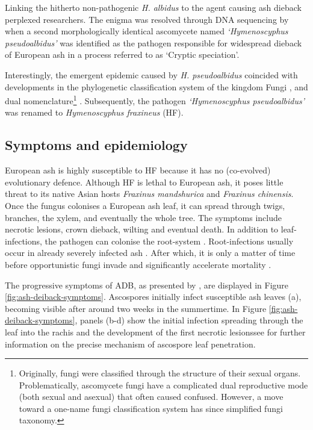 Linking the hitherto non-pathogenic \textit{H. albidus} to the agent causing ash dieback perplexed researchers. 
The enigma was resolved through DNA sequencing by \cite{queloz2011cryptic} when a second morphologically identical
ascomycete named \textit{`Hymenoscyphus pseudoalbidus'} was identified as the pathogen responsible for widespread dieback
of European ash in a process referred to as `Cryptic speciation'.

Interestingly, the emergent epidemic caused by \textit{H. pseudoalbidus} coincided with developments 
in the phylogenetic classification system of the kingdom Fungi \cite{hibbett2007higher}, 
and dual nomenclature\footnote{Originally, fungi were classified through the structure of their sexual organs.
Problematically, ascomycete fungi have a complicated dual reproductive mode (both sexual and asexual) that often caused confused. 
However, a move toward a one-name fungi classification system has since simplified fungi taxonomy.} 
\cite{wingfield2012one}. Subsequently, the pathogen \textit{`Hymenoscyphus pseudoalbidus'} was renamed to
\textit{Hymenoscyphus fraxineus} (HF).

\subsection{Symptoms and epidemiology}

European ash is highly susceptible to HF because it has no (co-evolved) evolutionary defence.
Although HF is lethal to European ash, it poses little threat to its native Asian hosts 
\textit{Fraxinus mandshurica} and \textit{Fraxinus chinensis}. Once the fungus colonises a European ash leaf,
it can spread through twigs, branches, the xylem, and eventually the whole tree.
The symptoms include necrotic lesions, crown dieback, wilting and eventual death.
In addition to leaf-infections, the pathogen can colonise the root-system \cite{schumacher2011general}.
Root-infections usually occur in already severely infected ash \cite{https://doi.org/10.1111/mpp.12073}. 
After which, it is only a matter of time before opportunistic fungi invade and significantly accelerate mortality
\cite{enderle2013temporal}.

The progressive symptoms of ADB, as presented by \cite{gross2014h}, are displayed in Figure \ref{fig:ash-deiback-symptoms}.
Ascospores initially infect susceptible ash leaves (a), 
becoming visible after around two weeks \cite{https://doi.org/10.1111/ppa.12048} in the summertime. 
In Figure \ref{fig:ash-deiback-symptoms}, panels (b-d) show the initial infection spreading through 
the leaf into the rachis and the development of the first necrotic lesions\textemdash see
\cite{https://doi.org/10.1111/ppa.12844} for further information on the precise mechanism of ascospore leaf penetration.


